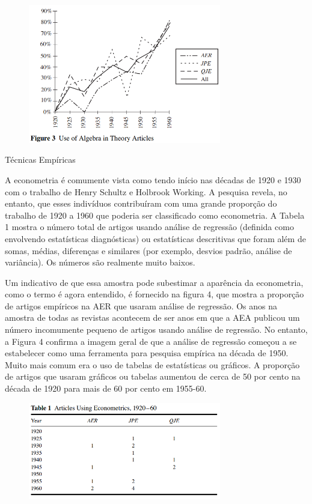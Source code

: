 \documentclass[12pt]{article}
\begin{document}
 \begin{figure}[H]
    \centering
    \includegraphics[width=0.75\textwidth]{4º Período/História do Pensamento Econômico/Tradução HPE/Tradução Tópico 7.2/figure 3.png}
    \end{figure}

Técnicas Empíricas

A econometria é comumente vista como tendo início nas décadas de 1920 e 1930 com o trabalho de Henry Schultz e Holbrook Working. A pesquisa revela, no entanto, que esses indivíduos contribuíram com uma grande proporção do trabalho de 1920 a 1960 que poderia ser classificado como econometria. A Tabela 1 mostra o número total de artigos usando análise de regressão (definida como envolvendo estatísticas diagnósticas) ou estatísticas descritivas que foram além de somas, médias, diferenças e similares (por exemplo, desvios padrão, análise de variância). Os números são realmente muito baixos.

Um indicativo de que essa amostra pode subestimar a aparência da econometria, como o termo é agora entendido, é fornecido na figura 4, que mostra a proporção de artigos empíricos na AER que usaram análise de regressão. Os anos na amostra de todas as revistas acontecem de ser anos em que a AEA publicou um número incomumente pequeno de artigos usando análise de regressão. No entanto, a Figura 4 confirma a imagem geral de que a análise de regressão começou a se estabelecer como uma ferramenta para pesquisa empírica na década de 1950. Muito mais comum era o uso de tabelas de estatísticas ou gráficos. A proporção de artigos que usaram gráficos ou tabelas aumentou de cerca de 50 por cento na década de 1920 para mais de 60 por cento em 1955-60.

\begin{figure}[H]
    \centering
    \includegraphics[width=0.75\textwidth]{4º Período/História do Pensamento Econômico/Tradução HPE/Tradução Tópico 7.2/table 1.png}
    \end{figure}
\end{document}
